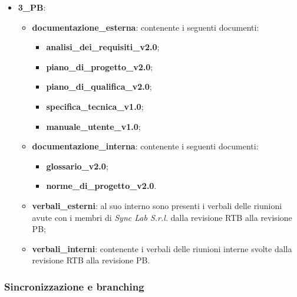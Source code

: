 \begin{itemize}
\begin{itemize}
	\end{itemize}
	\item \textbf{3\_PB}:
	\begin{itemize}
		\item \textbf{documentazione\_esterna}: contenente i seguenti documenti:
		\begin{itemize}
			\item \textbf{analisi\_dei\_requisiti\_v2.0};
			\item \textbf{piano\_di\_progetto\_v2.0};
			\item \textbf{piano\_di\_qualifica\_v2.0};
			\item \textbf{specifica\_tecnica\_v1.0};
			\item \textbf{manuale\_utente\_v1.0};
		\end{itemize}
		\item \textbf{documentazione\_interna}: contenente i seguenti documenti:
		\begin{itemize}
			\item \textbf{glossario\_v2.0};
			\item \textbf{norme\_di\_progetto\_v2.0}.
		\end{itemize}
		\item \textbf{verbali\_esterni}: al suo interno sono presenti i verbali delle riunioni avute con i membri di \textit{Sync Lab S.r.l.} dalla revisione RTB alla revisione PB;
		\item \textbf{verbali\_interni}: contenente i verbali delle riunioni interne svolte dalla revisione RTB alla revisione PB.
	\end{itemize}
\end{itemize}

\subsubsection{Sincronizzazione e branching}

